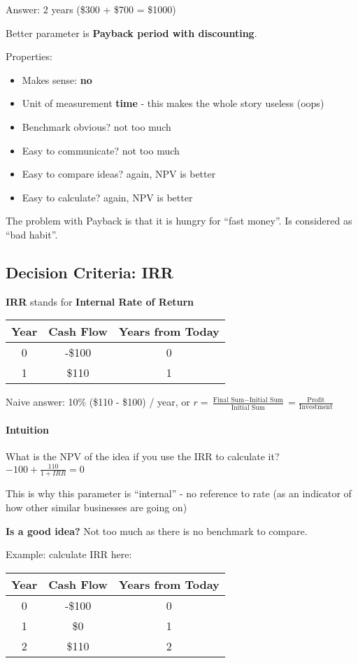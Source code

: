 \documentclass{scrartcl}
\begin{document}
Answer: 2 years (\$300 + \$700 = \$1000)

Better parameter is {\bf Payback period with discounting}.

Properties: \begin{itemize}
\item Makes sense: {\bf no}
\item Unit of measurement {\bf time} - this makes the whole story useless (oops)
\item Benchmark obvious? not too much
\item Easy to communicate? not too much
\item Easy to compare ideas? again, NPV is better
\item Easy to calculate? again, NPV is better
\end{itemize}

The problem with Payback is that it is hungry for ``fast money''. Is considered
as ``bad habit''.

\subsection{Decision Criteria: IRR}
\label{sec:4-6}

{\bf IRR} stands for {\bf Internal Rate of Return}

\begin{tabular}{c|c|c}
  Year & Cash Flow & Years from Today \\
  \hline
  0 & -\$100 & 0  \\
  1 & \$110 & 1 \\
\end{tabular}

Naive answer: 10\% (\$110 - \$100) / year, or $r = \frac{\text{Final Sum} -
  \text{Initial Sum}}{\text{Initial Sum}} = \frac{\text{Profit}}
{\text{Investment}}$

\paragraph{Intuition } What is the NPV of the idea if you use the IRR to
calculate it?$-100 + \frac{110}{1 + IRR} = 0$

This is why this parameter is ``internal'' - no reference to rate (as an
indicator of how other similar businesses are going on)

{\bf Is a good idea?} Not too much as there is no benchmark to compare.

Example: calculate IRR here:
\begin{tabular}{c|c|c}
  Year & Cash Flow & Years from Today \\
  \hline
  0 & -\$100 & 0  \\
  1 & \$0 & 1 \\
  2 & \$110 & 2 \\
\end{tabular}
\end{document}
